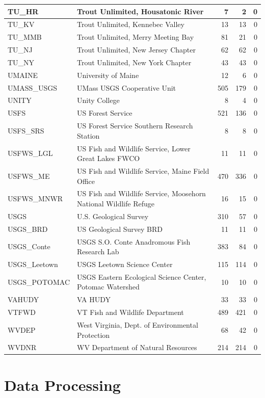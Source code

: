 \documentclass[
]{book}
\begin{document}
\begin{tabular}{l|l|r|r|r}
\hline
TU\_HR & Trout Unlimited, Housatonic River & 7 & 2 & 0\\
\hline
TU\_KV & Trout Unlimited, Kennebec Valley & 13 & 13 & 0\\
\hline
TU\_MMB & Trout Unlimited, Merry Meeting Bay & 81 & 21 & 0\\
\hline
TU\_NJ & Trout Unlimited, New Jersey Chapter & 62 & 62 & 0\\
\hline
TU\_NY & Trout Unlimited, New York Chapter & 43 & 43 & 0\\
\hline
UMAINE & University of Maine & 12 & 6 & 0\\
\hline
UMASS\_USGS & UMass USGS Cooperative Unit & 505 & 179 & 0\\
\hline
UNITY & Unity College & 8 & 4 & 0\\
\hline
USFS & US Forest Service & 521 & 136 & 0\\
\hline
USFS\_SRS & US Forest Service Southern Research Station & 8 & 8 & 0\\
\hline
USFWS\_LGL & US Fish and Wildlife Service, Lower Great Lakes FWCO & 11 & 11 & 0\\
\hline
USFWS\_ME & US Fish and Wildlife Service, Maine Field Office & 470 & 336 & 0\\
\hline
USFWS\_MNWR & US Fish and Wildlife Service, Moosehorn National Wildlife Refuge & 16 & 15 & 0\\
\hline
USGS & U.S. Geological Survey & 310 & 57 & 0\\
\hline
USGS\_BRD & US Geological Survey BRD & 11 & 11 & 0\\
\hline
USGS\_Conte & USGS S.O. Conte Anadromous Fish Research Lab & 383 & 84 & 0\\
\hline
USGS\_Leetown & USGS Leetown Science Center & 115 & 114 & 0\\
\hline
USGS\_POTOMAC & USGS Eastern Ecological Science Center, Potomac Watershed & 10 & 10 & 0\\
\hline
VAHUDY & VA HUDY & 33 & 33 & 0\\
\hline
VTFWD & VT Fish and Wildlife Department & 489 & 421 & 0\\
\hline
WVDEP & West Virginia, Dept. of Environmental Protection & 68 & 42 & 0\\
\hline
WVDNR & WV Department of Natural Resources & 214 & 214 & 0\\
\hline
\end{tabular}

\chapter{Data Processing}\label{data-processing}
\end{document}

